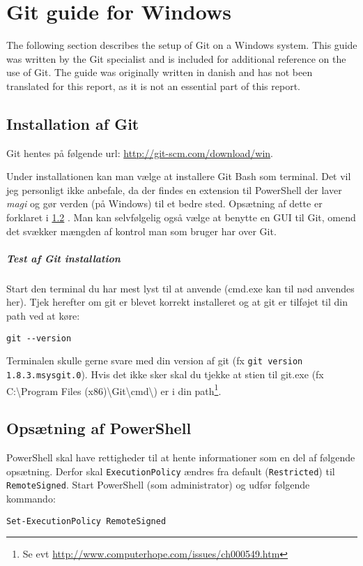 \chapter{Git guide for Windows}\label{gitguide}
The following section describes the setup of Git on a Windows system.
This guide was written by the Git specialist and is included for additional reference on the use of Git.
The guide was originally written in danish and has not been translated for this report, as it is not an essential part of this report.
\section{Installation af Git}
Git hentes på følgende url: \url{http://git-scm.com/download/win}.

Under installationen kan man vælge at installere Git Bash som terminal.
Det vil jeg personligt ikke anbefale, da der findes en extension til PowerShell der laver \textit{magi} og gør verden (på Windows) til et bedre sted.
Opsætning af dette er forklaret i \ref{gitguide:powershell} .
Man kan selvfølgelig også vælge at benytte en GUI til Git, omend det svækker mængden af kontrol man som bruger har over Git.

\paragraph{Test af Git installation}
Start den terminal du har mest lyst til at anvende (cmd.exe kan til nød anvendes her).
Tjek herefter om git er blevet korrekt installeret og at git er tilføjet til din path ved at køre:
\begin{lstlisting}
git --version
\end{lstlisting}
Terminalen skulle gerne svare med din version af git (fx \texttt{git version 1.8.3.msysgit.0}).
Hvis det ikke sker skal du tjekke at stien til git.exe (fx C:\textbackslash{}Program Files (x86)\textbackslash{}Git\textbackslash{}cmd\textbackslash{}) er i din path\footnote{Se evt \url{http://www.computerhope.com/issues/ch000549.htm}}.

\section{Opsætning af PowerShell}\label{gitguide:powershell}
PowerShell skal have rettigheder til at hente informationer som en del af følgende opsætning.
Derfor skal \texttt{ExecutionPolicy} ændres fra default (\texttt{Restricted}) til \texttt{RemoteSigned}.
Start PowerShell (som administrator) og udfør følgende kommando:
\begin{lstlisting}
Set-ExecutionPolicy RemoteSigned
\end{lstlisting}

